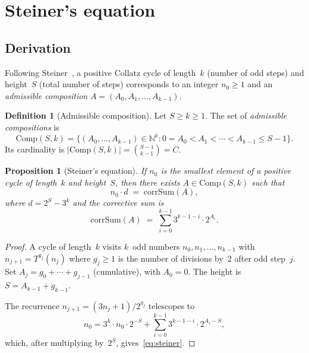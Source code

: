 \documentclass[12pt, a4paper]{amsart}
\theoremstyle{plain}
\newtheorem{proposition}[theorem]{Proposition}
\theoremstyle{definition}
\newtheorem{definition}[theorem]{Definition}
\theoremstyle{remark}
\newcommand{\N}{\mathbb{N}}
\newcommand{\Comp}{\mathrm{Comp}}
\newcommand{\corrSum}{\mathrm{corrSum}}
\begin{document}
\section{Steiner's equation}\label{sec:steiner}

\subsection{Derivation}

Following Steiner~\cite{Steiner1977}, a positive Collatz cycle
of length~$k$ (number of odd steps) and height~$S$ (total number
of steps) corresponds to an integer $n_0 \geq 1$ and an
\emph{admissible composition}
$A = (A_0, A_1, \ldots, A_{k-1})$.

\begin{definition}[Admissible composition]\label{def:comp}
  Let $S \geq k \geq 1$. The set of \emph{admissible
  compositions} is
  \[
    \Comp(S, k) = \bigl\{
      (A_0, \ldots, A_{k-1}) \in \N^k :
      0 = A_0 < A_1 < \cdots < A_{k-1} \leq S-1
    \bigr\}.
  \]
  Its cardinality is $|\Comp(S,k)| = \binom{S-1}{k-1} = C$.
\end{definition}

\begin{proposition}[Steiner's equation]\label{prop:steiner}
  If $n_0$ is the smallest element of a positive cycle of
  length~$k$ and height~$S$, then there exists
  $A \in \Comp(S,k)$ such that
  \begin{equation}\label{eq:steiner}
    n_0 \cdot d \;=\; \corrSum(A),
  \end{equation}
  where $d = 2^S - 3^k$ and the \emph{corrective sum} is
  \begin{equation}\label{eq:corrsum}
    \corrSum(A)
    \;=\; \sum_{i=0}^{k-1} 3^{k-1-i} \cdot 2^{A_i}.
  \end{equation}
\end{proposition}

\begin{proof}
  A cycle of length~$k$ visits $k$~odd numbers
  $n_0, n_1, \ldots, n_{k-1}$ with $n_{j+1} = T^{g_j}(n_j)$
  where $g_j \geq 1$ is the number of divisions by~$2$ after
  odd step~$j$. Set $A_j = g_0 + \cdots + g_{j-1}$
  (cumulative), with $A_0 = 0$. The height is
  $S = A_{k-1} + g_{k-1}$.

  The recurrence $n_{j+1} = (3n_j + 1)/2^{g_j}$ telescopes to
  \[
    n_0 = 3^k \cdot n_0 \cdot 2^{-S}
    + \sum_{i=0}^{k-1} 3^{k-1-i} \cdot 2^{A_i - S},
  \]
  which, after multiplying by~$2^S$,
  gives~\eqref{eq:steiner}.
\end{proof}
\end{document}
